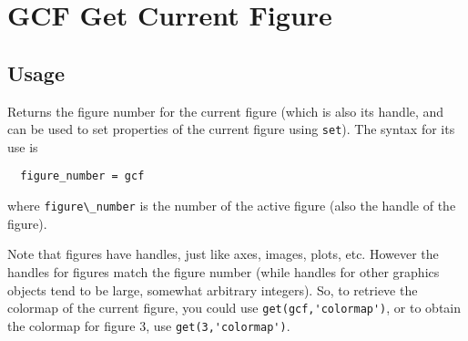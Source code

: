 \section{GCF Get Current Figure}

\subsection{Usage}

Returns the figure number for the current figure (which is also its handle,
and can be used to set properties of the current figure using \verb|set|).  
The syntax for its use
is
\begin{verbatim}
  figure_number = gcf
\end{verbatim}
where \verb|figure\_number| is the number of the active figure (also the handle of
the figure).

Note that figures have handles, just like axes, images, plots, etc.  However
the handles for figures match the figure number (while handles for other 
graphics objects tend to be large, somewhat arbitrary integers).  So, to 
retrieve the colormap of the current figure, you could 
use \verb|get(gcf,'colormap')|, or to obtain the colormap for figure 3, 
use \verb|get(3,'colormap')|.
